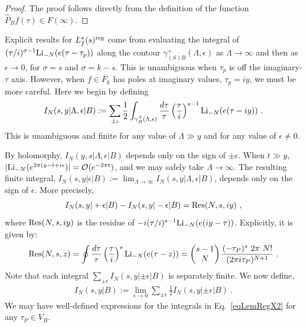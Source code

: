 \documentclass[11pt,a4paper]{article}
\newcommand{\g}{\gamma}
\newcommand{\e}{\epsilon}
\newcommand{\La}{\Lambda}
\newcommand{\BM}{\left(\begin{matrix}}
\newcommand{\EM}{\end{matrix}\right)}
\newcommand{\reg}{{\rm reg}}
\newcommand{\PF}{\widehat{P}} 				%
\begin{document}
\begin{proof}
The proof follows directly from the definition of the function $\PF_B f(\tau) \in F(\infty)$.
\end{proof}

Explicit results for $L_f^*(s)^\reg$ come from evaluating the integral of $(\tau/i)^{\sigma-1} {\rm Li}_{-N}(e(\tau-\tau_p))$ along the contour $\g_{(S)B}^+(\La,\e)$ as $\La \to \infty$ and then as $\e \to 0$, for $\sigma = s$ and $\sigma = k-s$. This is unambiguous when $\tau_p$ is off the imaginary-$\tau$ axis. However, when $f \in F_k$ has poles at imaginary values, $\tau_p = i y$, we must be more careful. Here we begin by defining
\begin{align}
I_N(s,y|\La,\e|B):= \sum_{\pm \e} \frac{1}{2} \int_{\g_B^+(\La,\e)} \frac{d\tau}{\tau} \left( \frac{\tau}{i} \right)^{s-1}{\rm Li}_{-N}(e(\tau-i y))~.
\end{align}
This is unambiguous and finite for any value of $\La \gg y$ and for any value of $\e\neq 0$. 

By holomorphy, $I_N(y,s|\La,\e|B)$ depends only on the sign of $\pm\e$. When $t \gg y$, $|{\rm Li}_{-N}(e^{2\pi (y-t+i\e})| = {\cal O}(e^{-2 \pi t})$, and we may safely take $\La \to \infty$. The resulting finite integral, $I_N(s,y|\e|B):= \lim_{\La \to \infty} I_N(s,y|\La,\e|B)$, depends only on the sign of $\e$. More precisely,
\begin{align}
I_N(s,y|+\e|B) - I_N(s,y|-\e|B) = {\rm Res}(N,s,i y) ~,
\end{align}
where ${\rm Res}(N, s, i y)$ is the residue of $-i (\tau/i)^{s-1} {\rm Li}_{-N}(e(iy-\tau))$. Explicitly, it is given by:
\begin{align}
{\rm Res}(N,s,z) = 
\oint \frac{d\tau}{\tau}  \left(\frac{\tau}{i}\right)^{s}{\rm Li}_{-N}(e(\tau-z))= \BM s-1 \\ N \EM \frac{(-\tau_P)^s~2 \pi~N!}{(2 \pi i \tau_P)^{N+1}} ~.\label{eqLemRegX7}
\end{align}
Note that each integral $\sum_{\pm \e}I_N(s,y|\pm\e|B)$ is separately finite. We now define,
\begin{align}
I_N(s,y|B) :=\lim_{\e \to 0} \sum_{\pm \e} \frac{1}{2} I_N(s,y|\pm \e|B)~.
\end{align}
We may have well-defined expressions for the integrals in Eq.~\eqref{eqLemRegX2} for any $\tau_P \in V_B$. 
\end{document}
